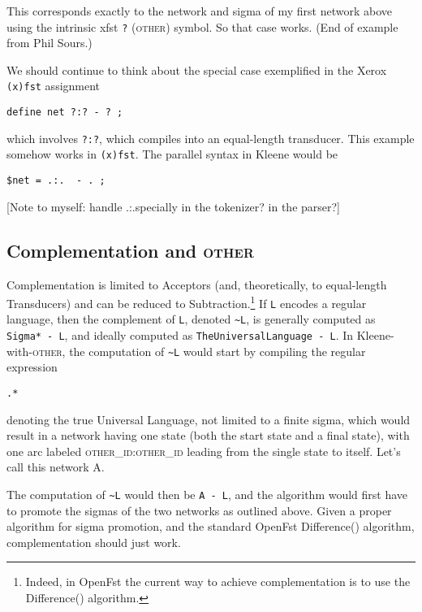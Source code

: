 \documentclass[letterpaper,11pt]{article}
\providecommand{\acro}{}\renewcommand{\acro}{\textsc}
\begin{document}
\noindent
This corresponds exactly to the network and sigma of my first network
above using the intrinsic xfst \texttt{?} (\acro{other}) symbol.  So that case works.
(End of example from Phil Sours.)


We should continue to think about the
special case exemplified in the Xerox \texttt{(x)fst} assignment

\begin{Verbatim}[fontsize=\small]
define net ?:? - ? ;
\end{Verbatim}

\noindent
which involves \texttt{?:?}, which compiles into an equal-length transducer.  This example
somehow works in \texttt{(x)fst}.
The parallel syntax in Kleene would be

\begin{Verbatim}[fontsize=\small]
$net = .:.  - . ;
\end{Verbatim}

[Note to myself:  handle .:.\@ specially in the tokenizer? in the parser?]

\subsection{Complementation and \acro{other}}

Complementation is limited to Acceptors (and, theoretically, to equal-length Transducers) 
and can be reduced
to Subtraction.\footnote{Indeed, in OpenFst the current way to achieve complementation is to use
the Difference() algorithm.}  If \texttt{L} encodes a regular language, then the complement
of \texttt{L}, denoted \texttt{\~{}L}, is generally computed as 
\texttt{Sigma*~-~L}, and ideally computed as \texttt{TheUniversalLanguage~-~L}.  In Kleene-with-\acro{other}, the computation of \texttt{\~{}L} 
would start by compiling the regular expression 

\begin{Verbatim}[fontsize=\footnotesize]
.*
\end{Verbatim}

\noindent
denoting the true Universal Language, not limited to a finite sigma, which would result in a network having one state (both the
start state and a final state), with one arc labeled \acro{other\_id}:\acro{other\_id}
leading from the single state to itself.  Let's call this network A.

The computation of \texttt{\~{}L} would then be \texttt{A~-~L}, and
the algorithm would first have to promote the sigmas of
the two networks as outlined above.  Given a
proper algorithm for sigma promotion, and the standard OpenFst Difference() algorithm,
complementation should just work.
\end{document}
